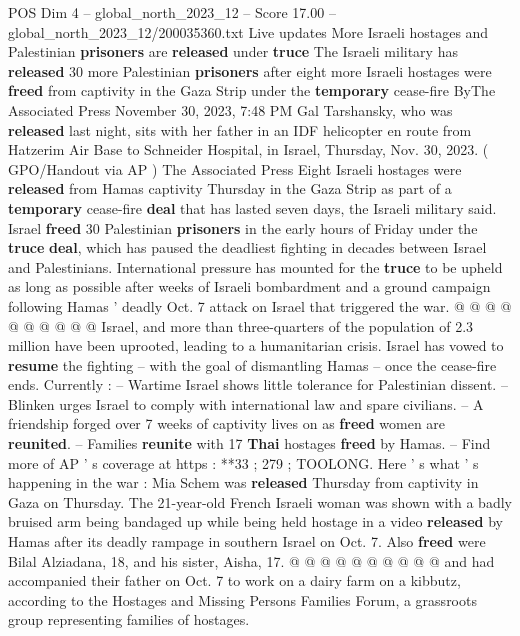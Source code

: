 \begin{textsample}{POS Dim 4 – global\_north\_2023\_12 – Score 17.00 – global\_north\_2023\_12/200035360.txt}  \label{ex:f4_pos_318}
Live updates More Israeli hostages and Palestinian \textbf{prisoners} are \textbf{released} under \textbf{truce} The Israeli military has \textbf{released} 30 more Palestinian \textbf{prisoners} after eight more Israeli hostages were \textbf{freed} from captivity in the Gaza Strip under the \textbf{temporary} cease-fire ByThe Associated Press November 30, 2023, 7:48 PM Gal Tarshansky, who was \textbf{released} last night, sits with her father in an IDF helicopter en route from Hatzerim Air Base to Schneider Hospital, in Israel, Thursday, Nov. 30, 2023. ( GPO/Handout via AP ) The Associated Press Eight Israeli hostages were \textbf{released} from Hamas captivity Thursday in the Gaza Strip as part of a \textbf{temporary} cease-fire \textbf{deal} that has lasted seven days, the Israeli military said.
Israel \textbf{freed} 30 Palestinian \textbf{prisoners} in the early hours of Friday under the \textbf{truce} \textbf{deal}, which has paused the deadliest fighting in decades between Israel and Palestinians.
International pressure has mounted for the \textbf{truce} to be upheld as long as possible after weeks of Israeli bombardment and a ground campaign following Hamas ' deadly Oct. 7 attack on Israel that triggered the war. @ @ @ @ @ @ @ @ @ @ Israel, and more than three-quarters of the population of 2.3 million have been uprooted, leading to a humanitarian crisis.
Israel has vowed to \textbf{resume} the fighting -- with the goal of dismantling Hamas -- once the cease-fire ends.
Currently : -- Wartime Israel shows little tolerance for Palestinian dissent. -- Blinken urges Israel to comply with international law and spare civilians. -- A friendship forged over 7 weeks of captivity lives on as \textbf{freed} women are \textbf{reunited}. -- Families \textbf{reunite} with 17 \textbf{Thai} hostages \textbf{freed} by Hamas. -- Find more of AP ' s coverage at https : **33 ; 279 ; TOOLONG.
Here ' s what ' s happening in the war : Mia Schem was \textbf{released} Thursday from captivity in Gaza on Thursday.
The 21-year-old French Israeli woman was shown with a badly bruised arm being bandaged up while being held hostage in a video \textbf{released} by Hamas after its deadly rampage in southern Israel on Oct. 7.
Also \textbf{freed} were Bilal Alziadana, 18, and his sister, Aisha, 17. @ @ @ @ @ @ @ @ @ @ and had accompanied their father on Oct. 7 to work on a dairy farm on a kibbutz, according to the Hostages and Missing Persons Families Forum, a grassroots group representing families of hostages.

\end{textsample}
